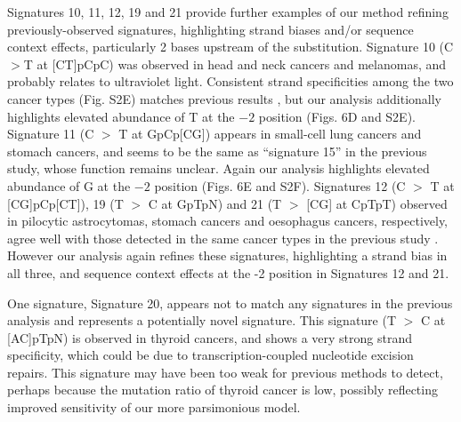 \documentclass[10pt,letterpaper]{article}
\begin{document}
Signatures 10, 11, 12, 19 and 21 provide further examples
of our method refining previously-observed signatures, highlighting strand biases and/or sequence context effects,
particularly 2 bases upstream of the substitution.
Signature 10 (C $>$T at [CT]pCpC) was observed in head and neck cancers and melanomas, and probably relates to ultraviolet light.
Consistent strand specificities among the two cancer types (Fig. S2E) matches previous results \cite{pmid23318258}, 
but our analysis additionally highlights elevated abundance of T at the $-2$ position (Figs. 6D and S2E). 
Signature 11 (C $>$ T at GpCp[CG]) appears in small-cell lung cancers and stomach cancers,
and seems to be the same as ``signature 15'' in the previous study, whose function remains unclear. Again our analysis highlights elevated abundance of G at the $-2$ position (Figs. 6E and S2F).
Signatures 12 (C $>$ T at [CG]pCp[CT]), 19 (T $>$ C at GpTpN) and 21 (T $>$ [CG] at CpTpT) observed in pilocytic astrocytomas, stomach cancers and oesophagus cancers, respectively, agree well with those detected in the same cancer types in the previous study \cite{pmid23318258}. However our analysis again refines these signatures,
highlighting a strand bias in all three, and sequence context effects at the -2 position in Signatures 12 and 21.


One signature, Signature 20, appears not to match any signatures in the previous analysis \cite{pmid23318258} and represents a potentially novel signature. 
This signature (T $>$ C at [AC]pTpN) is observed in thyroid cancers, and shows a very strong strand specificity, which could be due to transcription-coupled nucleotide excision repairs.
This signature may have been too weak for previous
methods to detect, perhaps because the mutation ratio of thyroid cancer is low, possibly reflecting improved sensitivity of our more parsimonious model.
\end{document}
